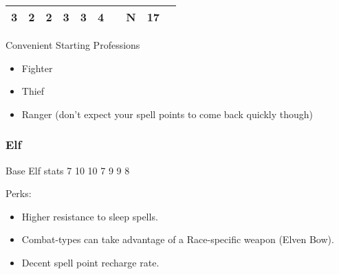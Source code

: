 \documentclass[12pt]{article}
\providecommand{\tightlist}{%
  \setlength{\itemsep}{0pt}\setlength{\parskip}{0pt}}
\begin{document}
\begin{longtable}[]{@{}llllllllll@{}}
\begin{minipage}[t]{0.06\columnwidth}\raggedright\strut
3
\strut\end{minipage} &
\begin{minipage}[t]{0.06\columnwidth}\raggedright\strut
2
\strut\end{minipage} &
\begin{minipage}[t]{0.06\columnwidth}\raggedright\strut
2
\strut\end{minipage} &
\begin{minipage}[t]{0.06\columnwidth}\raggedright\strut
3
\strut\end{minipage} &
\begin{minipage}[t]{0.06\columnwidth}\raggedright\strut
3
\strut\end{minipage} &
\begin{minipage}[t]{0.06\columnwidth}\raggedright\strut
4
\strut\end{minipage} &
\begin{minipage}[t]{0.06\columnwidth}\raggedright\strut
\strut\end{minipage} &
\begin{minipage}[t]{0.07\columnwidth}\raggedright\strut
N
\strut\end{minipage} &
\begin{minipage}[t]{0.08\columnwidth}\raggedright\strut
17
\strut\end{minipage}\tabularnewline
\bottomrule
\end{longtable}

Convenient Starting Professions

\begin{itemize}
\item
  Fighter
\item
  Thief
\item
  Ranger (don't expect your spell points to come back quickly though)
\end{itemize}

\subsubsection{Elf}\label{elf}

Base Elf stats 7 10 10 7 9 9 8

Perks:

\begin{itemize}
\tightlist
\item
  Higher resistance to sleep spells.
\item
  Combat-types can take advantage of a Race-specific weapon (Elven Bow).
\item
  Decent spell point recharge rate.
\end{itemize}
\end{document}
